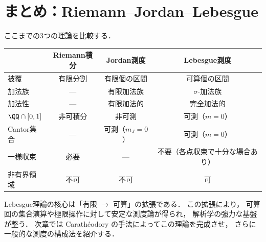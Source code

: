 \section{まとめ：Riemann--Jordan--Lebesgue}\label{sec:summary-rjl}

ここまでの3つの理論を比較する．

\begin{center}
\renewcommand{\arraystretch}{1.3}
\begin{tabular}{l|c|c|c}
 & Riemann積分 & Jordan測度 & Lebesgue測度 \\ \hline
被覆 & 有限分割 & 有限個の区間 & 可算個の区間 \\
加法族 & --- & 有限加法族 & $\sigma$-加法族 \\
加法性 & --- & 有限加法的 & 完全加法的 \\
$\QQ \cap [0,1]$ & 非可積分 & 非可測 & 可測（$m=0$）\\
Cantor集合 & --- & 可測（$m_J=0$） & 可測（$m=0$） \\
一様収束 & 必要 & --- & 不要（各点収束で十分な場合あり）\\
非有界領域 & 不可 & 不可 & 可
\end{tabular}
\end{center}

Lebesgue理論の核心は「有限 $\to$ 可算」の拡張である．
この拡張により，
可算回の集合演算や極限操作に対して安定な測度論が得られ，
解析学の強力な基盤が整う．
次章では Carath\'eodory の手法によってこの理論を完成させ，
さらに一般的な測度の構成法を紹介する．
